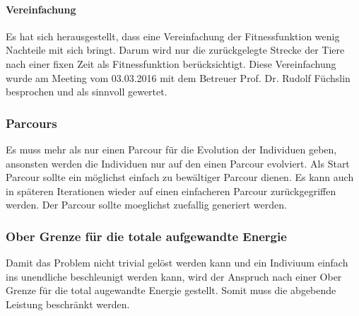      \paragraph{Vereinfachung}
        Es hat sich herausgestellt, dass eine Vereinfachung der Fitnessfunktion wenig Nachteile mit sich bringt.
        Darum wird nur die zurückgelegte Strecke der Tiere nach einer fixen Zeit als Fitnessfunktion berücksichtigt.
        Diese Vereinfachung wurde am Meeting vom 03.03.2016 mit dem Betreuer Prof. Dr. Rudolf Füchslin besprochen und als sinnvoll gewertet.
    \subsubsection{Parcours}
      Es muss mehr als nur einen Parcour für die Evolution der Individuen geben,
      ansonsten werden die Individuen nur auf den einen Parcour evolviert.
      Als Start Parcour sollte ein möglichst einfach zu bewältiger Parcour dienen.
      Es kann auch in späteren Iterationen wieder auf einen einfacheren Parcour zurückgegriffen werden.
      Der Parcour sollte moeglichst zuefallig generiert werden.
    \subsubsection{Ober Grenze für die totale aufgewandte Energie}
      Damit das Problem nicht trivial gelöst werden kann und ein Indiviuum einfach ins unendliche beschleunigt werden kann,
      wird der Anspruch nach einer Ober Grenze für die total augewandte Energie gestellt. Somit muss die abgebende Leistung beschränkt werden.
